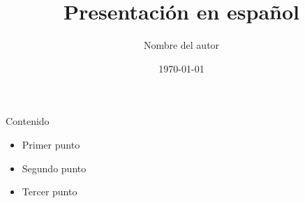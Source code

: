 \documentclass{beamer}
\title{Presentación en español}
\author{Nombre del autor}
\date{\today}
\begin{document}
\begin{frame}
  \titlepage
\end{frame}

\begin{frame}{Contenido}
  \begin{itemize}
    \item Primer punto
    \item Segundo punto
    \item Tercer punto
  \end{itemize}
\end{frame}
\end{document}
